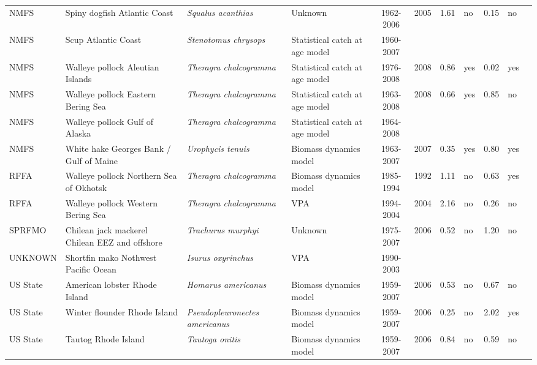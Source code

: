 \begin{longtable}{p{1.8cm}p{3.5cm}p{3.5cm}p{3cm}cccp{0.9cm}cp{0.9cm}c}
  NMFS & Spiny dogfish Atlantic Coast & \textit{Squalus acanthias} & Unknown & 1962-2006 & 2005 & 1.61 & no & 0.15 & no & \cite{spinydogfish2006.pdf} \\ 
  NMFS & Scup Atlantic Coast & \textit{Stenotomus chrysops} & Statistical catch at age model & 1960-2007 &  &  &  &  &  & \cite{crd0902.pdf} \\ 
  NMFS & Walleye pollock Aleutian Islands & \textit{Theragra chalcogramma} & Statistical catch at age model & 1976-2008 & 2008 & 0.86 & yes & 0.02 & yes & \cite{AFSC-WPOLLAI-2008-Walleye pollock AI.pdf} \\ 
  NMFS & Walleye pollock Eastern Bering Sea & \textit{Theragra chalcogramma} & Statistical catch at age model & 1963-2008 & 2008 & 0.66 & yes & 0.85 & no & \cite{AFSC-WPOLLEBS-2008-Walleye pollock EBS.pdf} \\ 
  NMFS & Walleye pollock Gulf of Alaska & \textit{Theragra chalcogramma} & Statistical catch at age model & 1964-2008 &  &  &  &  &  & \cite{AFSC-WPOLLGA-2008-Walleye pollock GA.pdf} \\ 
  NMFS & White hake Georges Bank / Gulf of Maine & \textit{Urophycis tenuis} & Biomass dynamics model & 1963-2007 & 2007 & 0.35 & yes & 0.80 & yes & \cite{WhiteHake2008.pdf} \\ 
  RFFA & Walleye pollock Northern Sea of Okhotsk & \textit{Theragra chalcogramma} & Biomass dynamics model & 1985-1994 & 1992 & 1.11 & no & 0.63 & yes & \cite{WPOLLNSO-1997-JENSEN.pdf} \\ 
  RFFA & Walleye pollock Western Bering Sea & \textit{Theragra chalcogramma} & VPA & 1994-2004 & 2004 & 2.16 & no & 0.26 & no & \cite{WPOLLWBS-2004-JENSEN.pdf} \\ 
  SPRFMO & Chilean jack mackerel Chilean EEZ and offshore & \textit{Trachurus murphyi} & Unknown & 1975-2007 & 2006 & 0.52 & no & 1.20 & no & \cite{JENSEN-JACKMACKCH-2008.pdf} \\ 
  UNKNOWN & Shortfin mako Nothwest Pacific Ocean & \textit{Isurus oxyrinchus} & VPA & 1990-2003 &  &  &  &  &  & \cite{Chang-Liu-2009-Shortfin-mako-NWPAC.pdf} \\ 
  US State & American lobster Rhode Island & \textit{Homarus americanus} & Biomass dynamics model & 1959-2007 & 2006 & 0.53 & no & 0.67 & no & \cite{NA} \\ 
  US State & Winter flounder Rhode Island & \textit{Pseudopleuronectes americanus} & Biomass dynamics model & 1959-2007 & 2006 & 0.25 & no & 2.02 & yes & \cite{NA} \\ 
  US State & Tautog Rhode Island & \textit{Tautoga onitis} & Biomass dynamics model & 1959-2007 & 2006 & 0.84 & no & 0.59 & no & \cite{NA} \\ 

\end{longtable}
